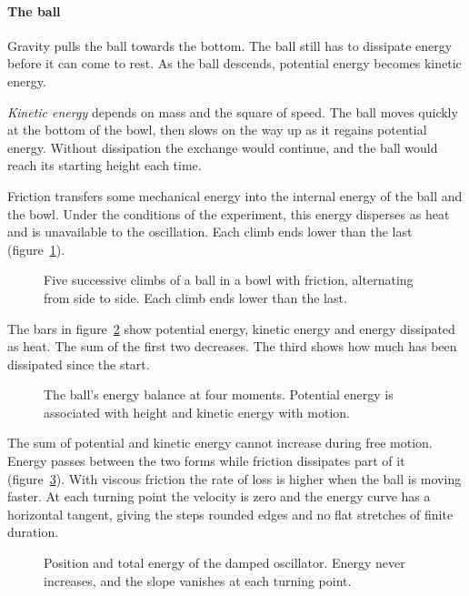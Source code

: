 \paragraph{The ball} Gravity pulls the ball towards the bottom. The ball still has to dissipate energy before it can come to rest. As the ball descends, potential energy becomes kinetic energy.

\emph{Kinetic energy} depends on mass and the square of speed. The ball moves quickly at the bottom of the bowl, then slows on the way up as it regains potential energy. Without dissipation the exchange would continue, and the ball would reach its starting height each time.

Friction transfers some mechanical energy into the internal energy of the ball and the bowl. Under the conditions of the experiment, this energy disperses as heat and is unavailable to the oscillation. Each climb ends lower than the last (figure~\ref{fig:quote}).

\begin{figure}
\caption{Five successive climbs of a ball in a bowl with friction, alternating from side to side. Each climb ends lower than the last.}
\label{fig:quote}
\end{figure}

The bars in figure~\ref{fig:bilancio} show potential energy, kinetic energy and energy dissipated as heat. The sum of the first two decreases. The third shows how much has been dissipated since the start.

\begin{figure}
\caption{The ball's energy balance at four moments. Potential energy is associated with height and kinetic energy with motion.}
\label{fig:bilancio}
\end{figure}

The sum of potential and kinetic energy cannot increase during free motion. Energy passes between the two forms while friction dissipates part of it (figure~\ref{fig:gradini}). With viscous friction the rate of loss is higher when the ball is moving faster. At each turning point the velocity is zero and the energy curve has a horizontal tangent, giving the steps rounded edges and no flat stretches of finite duration.

\begin{figure}
\caption{Position and total energy of the damped oscillator. Energy never increases, and the slope vanishes at each turning point.}
\label{fig:gradini}
\end{figure}

